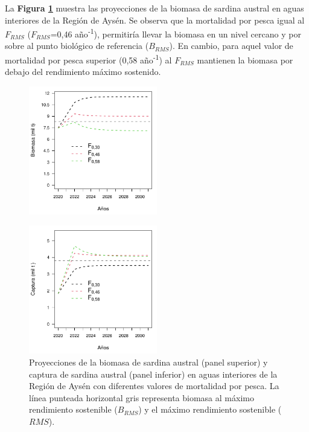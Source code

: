 \documentclass[
  spanish,
]{article}
\begin{document}
La \textbf{Figura \ref{Fig16}} muestra las proyecciones de la biomasa de
sardina austral en aguas interiores de la Región de Aysén. Se observa
que la mortalidad por pesca igual al \(F_{RMS}\) (\(F_{RMS}\)=0,46
año\textsuperscript{-1}), permitiría llevar la biomasa en un nivel
cercano y por sobre al punto biológico de referencia (\(B_{RMS}\)). En
cambio, para aquel valor de mortalidad por pesca superior (0,58
año\textsuperscript{-1}) al \(F_{RMS}\) mantienen la biomasa por debajo
del rendimiento máximo sostenido.

\vspace{0.5cm}

\begin{figure}[h!]
\centering
\includegraphics[width=0.5\textwidth]{Figuras/Fig5_Zhou2013_Proyeccion_B-1.pdf}
\end{figure}

\vspace{-0.1cm}

\begin{figure}[h!]
\centering
\includegraphics[width=0.5\textwidth]{Figuras/Fig6_Zhou2013_capturas-1.pdf}
\caption{Proyecciones de la biomasa de sardina austral (panel superior) y captura de sardina austral (panel inferior) en aguas interiores de la Región de Aysén con diferentes valores de mortalidad por pesca. La línea punteada horizontal gris representa biomasa al máximo rendimiento sostenible ($B_{RMS}$) y el máximo rendimiento sostenible ($RMS$).}
\label{Fig16}
\end{figure}
\end{document}
